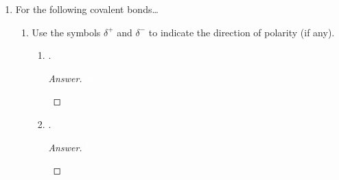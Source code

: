 \documentclass[../psets.tex]{subfiles}
\begin{document}
\begin{enumerate}
\begin{enumerate}
        \item {}.
        \begin{proof}[Answer]
            ${\color{white}hi}$
            \begin{center}
            \end{center}
            Nonpolar covalent.
        \end{proof}
        \item {}.
        \begin{proof}[Answer]
            ${\color{white}hi}$
            \begin{center}
            \end{center}
             is polar covalent;  is nonpolar covalent.
        \end{proof}
        \item {}.
        \begin{proof}[Answer]
            ${\color{white}hi}$
            \begin{center}
            \end{center}
            Ionic.
        \end{proof}
    \end{enumerate}
    \item For the following covalent bonds\dots
    \begin{enumerate}
        \item Use the symbols $\delta^+$ and $\delta^-$ to indicate the direction of polarity (if any).
        \begin{enumerate}
            \item {}.
            \begin{proof}[Answer]
                ${\color{white}hi}$
                \begin{center}
                \end{center}
            \end{proof}
            \item {}.
            \begin{proof}[Answer]
                ${\color{white}hi}$
                \begin{center}

\end{center}
\end{proof}
\end{enumerate}
\end{enumerate}
\end{enumerate}
\end{document}
